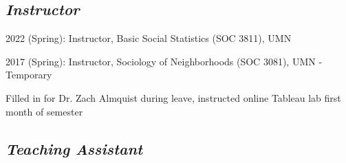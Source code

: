 \documentclass[letterpaper]{article}
\renewenvironment{itemize}{
  \begin{list}{}{
    \setlength{\leftmargin}{1.5em}
  }
}{
  \end{list}
}
\begin{document}
\subsection*{\textit{Instructor}}

\begin{itemize} 

\item 2022 (Spring): Instructor, Basic Social Statistics (SOC 3811), UMN

\item 2017 (Spring): Instructor, Sociology of Neighborhoods (SOC 3081), UMN - Temporary
       \begin{itemize}
	\item Filled in for Dr. Zach Almquist during leave, instructed online Tableau lab first month of semester
	\end{itemize}
\end{itemize}

\subsection*{\textit{Teaching Assistant}}
\end{document}
